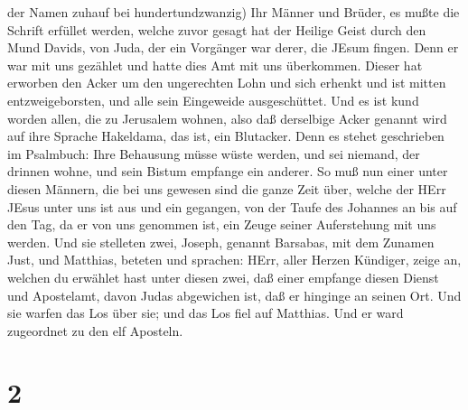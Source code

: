 der Namen zuhauf bei hundertundzwanzig)  Ihr Männer und
Brüder, es mußte die Schrift erfüllet werden, welche zuvor gesagt hat
der Heilige Geist durch den Mund Davids, von Juda, der ein Vorgänger war
derer, die JEsum fingen.  Denn er war mit uns gezählet und
hatte dies Amt mit uns überkommen.  Dieser hat erworben den
Acker um den ungerechten Lohn und sich erhenkt und ist mitten
entzweigeborsten, und alle sein Eingeweide ausgeschüttet. 
Und es ist kund worden allen, die zu Jerusalem wohnen, also daß
derselbige Acker genannt wird auf ihre Sprache Hakeldama, das ist, ein
Blutacker.  Denn es stehet geschrieben im Psalmbuch: Ihre
Behausung müsse wüste werden, und sei niemand, der drinnen wohne, und
sein Bistum empfange ein anderer.  So muß nun einer unter
diesen Männern, die bei uns gewesen sind die ganze Zeit über, welche der
HErr JEsus unter uns ist aus und ein gegangen,  von der
Taufe des Johannes an bis auf den Tag, da er von uns genommen ist, ein
Zeuge seiner Auferstehung mit uns werden.  Und sie
stelleten zwei, Joseph, genannt Barsabas, mit dem Zunamen Just, und
Matthias,  beteten und sprachen: HErr, aller Herzen
Kündiger, zeige an, welchen du erwählet hast unter diesen zwei,
 daß einer empfange diesen Dienst und Apostelamt, davon
Judas abgewichen ist, daß er hinginge an seinen Ort.  Und
sie warfen das Los über sie; und das Los fiel auf Matthias. Und er ward
zugeordnet zu den elf Aposteln.

\hypertarget{section-1}{%
\section{2}\label{section-1}}


